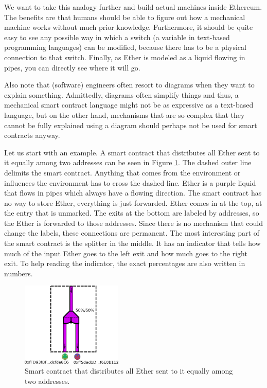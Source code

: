 \documentclass[11pt,letterpaper]{article}
\begin{document}
We want to take this analogy further and build actual machines inside Ethereum.
The benefits are that humans should be able to figure out how a mechanical
machine works without much prior knowledge. Furthermore, it should be quite
easy to see any possible way in which a switch (a variable in text-based
programming languages) can be modified, because there has to be a physical
connection to that switch. Finally, as Ether is modeled as a liquid flowing
in pipes, you can directly see where it will go.

Also note that (software) engineers often resort to diagrams when they
want to explain something. Admittedly, diagrams often simplify things and
thus, a mechanical smart contract language might not be as expressive as
a text-based language, but on the other hand, mechanisms that are so complex
that they cannot be fully explained using a diagram should perhaps not be used
for smart contracts anyway.

Let us start with an example. A smart contract that distributes
all Ether sent to it equally among two addresses can be seen in Figure \ref{splitter}.
The dashed outer line delimits the smart contract. Anything that comes from
the environment or influences the environment has to cross the dashed line.
Ether is a purple liquid that flows in pipes which always have a flowing direction.
The smart contract has no way to store Ether, everything is just forwarded.
Ether comes in at the top, at the entry that is unmarked. The exits at the
bottom are labeled by addresses, so the Ether is forwarded to those
addresses. Since there is no mechanism that could
change the labels, these connections are permanent.
The most interesting part of the smart contract is the splitter in the
middle. It has an indicator that tells how much of the input Ether goes to the
left exit and how much goes to the right exit. To help reading the indicator,
the exact percentages are also written in numbers.

\begin{figure}
\center
\includegraphics[height=4cm]{splitter.pdf}
\caption{Smart contract that distributes all Ether sent to it equally among
two addresses.}
\label{splitter}
\end{figure}
\end{document}
